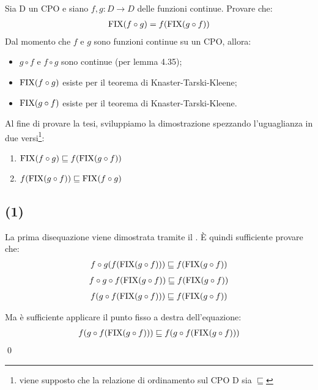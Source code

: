 \newcommand{\lt}{\sqsubseteq}

{Sia D un CPO e siano $f,g: D \to{} D$ delle funzioni continue. Provare che:
\begin{align*}
\textrm{\normalfont{FIX}}(f \circ g) = f(\textrm{\normalfont{FIX}}(g \circ f))
\end{align*}
}
{}
Dal momento che $f$ e $g$ sono funzioni continue su un CPO, allora:

\begin{itemize}
  \item $g \circ f$ e $f \circ g$ sono continue (per lemma 4.35);
  \item $\textrm{\normalfont{FIX}}(f \circ g)$ esiste per il teorema di Knaster-Tarski-Kleene;
  \item $\textrm{\normalfont{FIX}}(g \circ f)$ esiste per il teorema di Knaster-Tarski-Kleene.
\end{itemize}

Al fine di provare la tesi, sviluppiamo la dimostrazione spezzando l'uguaglianza
in due versi\footnote{viene supposto che la relazione di ordinamento sul CPO D
sia $\lt$}:

\begin{enumerate}[label=(\arabic*)]
  \item $\fixp{f \circ g} \lt f(\fixp{g \circ f})$
  \item $f(\fixp{g \circ f}) \lt \fixp{f \circ g}$
\end{enumerate}

\subsection{(1)}
La prima disequazione viene dimostrata tramite il \FPIL. È quindi sufficiente
provare che:
\begin{align*}
f \circ g(f(\fixp{g \circ f})) \lt f(\fixp{g \circ f})
\end{align*}
\begin{align*}
f \circ g \circ f(\fixp{g \circ f}) \lt f(\fixp{g \circ f})
\end{align*}
\begin{align*}
f (g \circ f(\fixp{g \circ f})) \lt f(\fixp{g \circ f})
\end{align*}

Ma è sufficiente applicare il punto fisso a destra dell'equazione:
\begin{align*}
f (g \circ f(\fixp{g \circ f})) \lt f (g \circ f(\fixp{g \circ f}))
\end{align*} \qed

